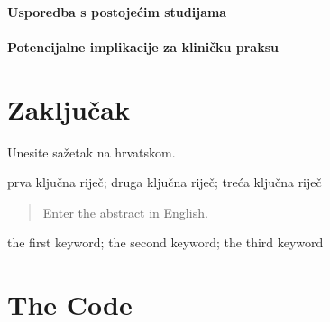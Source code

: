 \documentclass[zavrsnirad]{fer}
\begin{document}
\subsubsection{Usporedba s postojećim studijama}

\subsubsection{Potencijalne implikacije za kliničku praksu}


\chapter{Zaključak}
\label{pog:zakljucak}









\begin{sazetak}
  Unesite sažetak na hrvatskom.


\end{sazetak}

\begin{kljucnerijeci}
  prva ključna riječ; druga ključna riječ; treća ključna riječ
\end{kljucnerijeci}


\begin{abstract}
  Enter the abstract in English.
  
  \blindtext 
\end{abstract}

\begin{keywords}
  the first keyword; the second keyword; the third keyword
\end{keywords}



\backmatter

\chapter{The Code}
\end{document}

